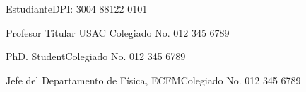 \begin{multicols}{2}
    \signature{Diego Rodolfo Sarceño Ramírez}{Estudiante}{DPI: 3004 88122 0101}
    \vspace{1.5cm}
    \signature{PhD. Giovanni Ramírez}{Profesor Titular USAC}{ Colegiado No. 012 345 6789}
    \columnbreak
    \signature{Lic. Jose Alejandro Franco}{PhD. Student}{Colegiado No. 012 345 6789}
    \vspace{1.5cm}
    \signature{Ing. Rodolfo Samayoa}{Jefe del Departamento de Física, ECFM}{Colegiado No. 012 345 6789}
\end{multicols}